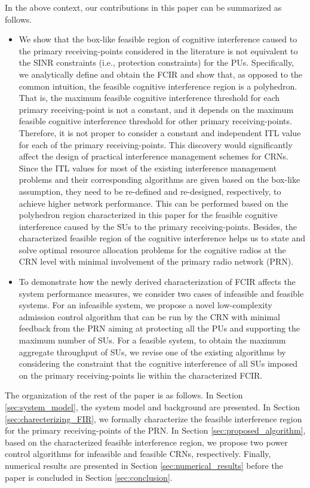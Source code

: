 \documentclass[journal,twoside]{IEEEtran}
\begin{document}
	In the above context, our contributions in this paper can be summarized as follows.
	\begin{itemize}
	\item
		We show that the box-like feasible region of cognitive interference caused to  the primary receiving-points considered in the literature is not equivalent to the SINR constraints (i.e., protection constraints) for the PUs. Specifically, we analytically define and obtain the FCIR and show that, as opposed to the  common intuition, the feasible cognitive interference region is a polyhedron. That is, the maximum feasible cognitive interference threshold for each primary receiving-point is not a constant, and it depends on the maximum feasible cognitive interference threshold for other primary receiving-points.
		Therefore, it is not proper to consider a constant and independent ITL value for each of the primary receiving-points. This discovery  would significantly affect the design of practical interference management schemes for CRNs. Since the ITL values for most of the existing interference management problems and their corresponding algorithms are given based on the box-like assumption, they need to be re-defined and re-designed, respectively, to achieve higher network performance. This can be performed based on the polyhedron  region characterized in this paper for the feasible cognitive interference caused by the SUs to the primary receiving-points. Besides, the characterized feasible region of the cognitive interference helps us to state and solve optimal resource allocation problems for the cognitive radios at the CRN level with minimal involvement of the primary radio network (PRN).
\item
		To demonstrate how  the newly derived characterization of FCIR affects the system performance measures, we consider two cases of infeasible and feasible systems. For an infeasible system, we propose a novel low-complexity admission control algorithm that can be run by the CRN with minimal feedback from the PRN aiming at protecting all the PUs and supporting the maximum number of SUs. For a feasible system, to obtain the maximum aggregate throughput of SUs, we revise one of the existing algorithms by considering the constraint that the cognitive interference of all SUs imposed on the primary receiving-points lie within the characterized FCIR. \end{itemize}
	
	The organization of the rest of the paper is as follows.  In Section \ref{sec:system_model}, the system model and background  are presented. In Section \ref{sec:charecterizing_FIR}, we formally characterize the feasible interference region for the primary receiving-points of the PRN. In Section \ref{sec:proposed_algorithm}, based on the characterized feasible interference region, we propose two power control algorithms for infeasible and feasible CRNs, respectively. Finally, numerical results  are presented in Section \ref{sec:numerical_results} before the paper is concluded in Section \ref{sec:conclusion}.
 
\end{document}

